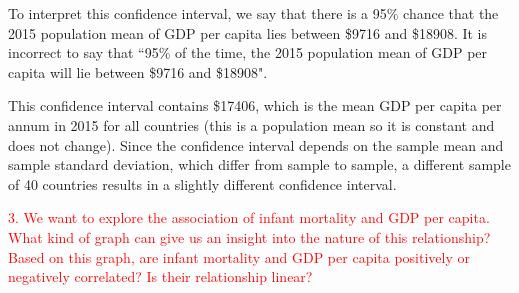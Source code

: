 \documentclass[12pt]{report}
\begin{document}
\noindent To interpret this confidence interval, we say that there is a 95\% chance that the 2015 population mean of GDP per capita lies between \$9716 and \$18908. It is incorrect to say that ``95\% of the time, the 2015 population mean of GDP per capita will lie between \$9716 and \$18908".

\noindent This confidence interval contains \$17406, which is the mean GDP per capita per annum in 2015 for all countries (this is a population mean so it is constant and does not change). Since the confidence interval depends on the sample mean and sample standard deviation, which differ from sample to sample, a different sample of 40 countries results in a slightly different confidence interval. 


\newpage
\noindent \textcolor{red}{3. We want to explore the association of infant mortality and GDP per capita. What kind of graph can give us an insight into the nature of this relationship? Based on this graph, are infant mortality and GDP per capita positively or negatively correlated? Is their relationship linear?}
\end{document}
